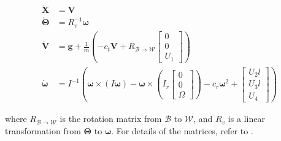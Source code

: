 \documentclass[journal,11pt,onecolumn,draftclsnofoot,]{IEEEtran}
\begin{document}
\begin{equation}
\label{eq:state-space_compact}
\begin{split}
\boldsymbol{\dot{X}}&=\boldsymbol{V} \\
\boldsymbol{\dot{\Theta}}&=R_v^{-1}\boldsymbol{\omega} \\
\boldsymbol{\dot{V}}&=\boldsymbol{g}+\frac{1}{m}\left(-c_t\boldsymbol{V}+R_{\mathcal{B}\rightarrow \mathcal{W}}
\begin{bmatrix}
0\\ 0\\ U_1
\end{bmatrix}
\right) \\
\boldsymbol{\dot{\omega}}&=I^{-1} \left(\boldsymbol{\omega}\times \left(I\boldsymbol{\omega}\right)-\boldsymbol{\omega} \times \left(I_r 
\begin{bmatrix}
0\\ 0\\ \Omega
\end{bmatrix}
\right)-c_r \boldsymbol{\omega}^2+ 
\begin{bmatrix}
U_2l \\ U_3l \\ U_4
\end{bmatrix}
\right)
\end{split}
\end{equation}

where $R_{\mathcal{B}\rightarrow \mathcal{W}}$ is the rotation matrix from $\mathcal{B}$ to $\mathcal{W}$, and $R_v$ is a linear transformation from $\boldsymbol{\dot{\Theta}}$ to $\boldsymbol{\omega}$. For details of the matrices, refer to \cite{huang2010adaptive}.

%
%
\end{document}
